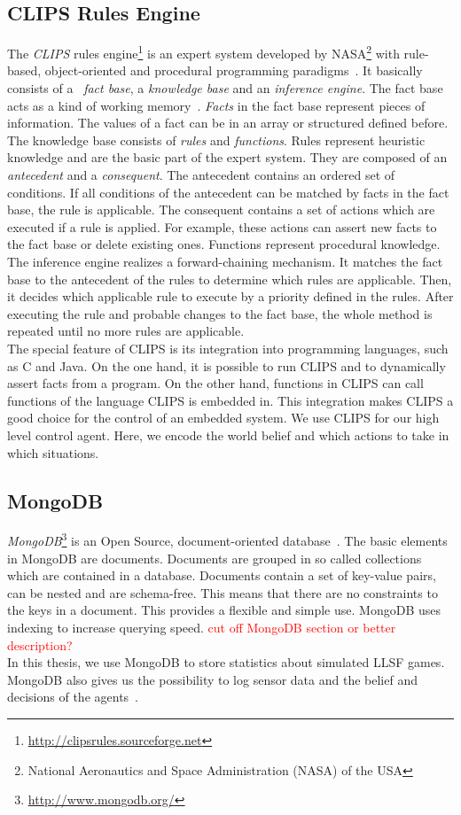 \subsection{CLIPS Rules Engine}
The \textit{CLIPS} rules engine\footnote{\url{http://clipsrules.sourceforge.net}} is an expert system developed by NASA\footnote{National Aeronautics and Space Administration (NASA) of the USA} with rule-based, object-oriented and procedural programming paradigms~\cite{Clips,clips_manual}. It basically consists of a ~\textit{fact base}, a \textit{knowledge base} and an \textit{inference engine}. The fact base acts as a kind of working memory~\cite{Incremental}. \textit{Facts} in the fact base represent pieces of information. The values of a fact can be in an array or structured defined before. The knowledge base consists of \textit{rules} and \textit{functions}. Rules represent heuristic knowledge and are the basic part of the expert system. They are composed of an \textit{antecedent} and a \textit{consequent}. The antecedent contains an ordered set of conditions. If all conditions of the antecedent can be matched by facts in the fact base, the rule is applicable. The consequent contains a set of actions which are executed if a rule is applied. For example, these actions can assert new facts to the fact base or delete existing ones. Functions represent procedural knowledge. The inference engine realizes a forward-chaining mechanism. It matches the fact base to the antecedent of the rules to determine which rules are applicable. Then, it decides which applicable rule to execute by a priority defined in the rules. After executing the rule and probable changes to the fact base, the whole method is repeated until no more rules are applicable.\\
The special feature of CLIPS is its integration into programming languages, such as C and Java. On the one hand, it is possible to run CLIPS and to dynamically assert facts from a program. On the other hand, functions in CLIPS can call functions of the language CLIPS is embedded in. This integration makes CLIPS a good choice for the control of an embedded system. We use CLIPS for our high level control agent. Here, we encode the world belief and which actions to take in which situations.

\subsection{MongoDB}
\textit{MongoDB}\footnote{\url{http://www.mongodb.org/}} is an Open Source, document-oriented database~\cite{mongodb,KlingenDA}. The basic elements in MongoDB are documents. Documents are grouped in so called collections which are contained in a database. Documents contain a set of key-value pairs, can be nested and are schema-free. This means that there are no constraints to the keys in a document. This provides a flexible and simple use. MongoDB uses indexing to increase querying speed. \textcolor{red}{cut off MongoDB section or better description?}\\
In this thesis, we use MongoDB to store statistics about simulated LLSF games. MongoDB also gives us the possibility to log sensor data and the belief and decisions of the agents~\cite{KlingenDA}.
